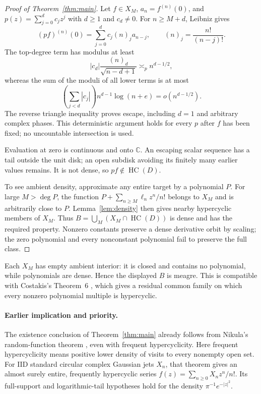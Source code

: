 \documentclass[11pt]{article}
\newcommand{\HC}{\operatorname{HC}}
\newcommand{\C}{\mathbb C}
\begin{document}
\begin{proof}[Proof of Theorem~\ref{thm:main}]
Let $f\in X_M$, $a_n=f^{(n)}(0)$, and
$p(z)=\sum_{j=0}^dc_jz^j$ with $d\ge1$ and $c_d\ne0$.
For $n\ge M+d$, Leibniz gives
\[
 (pf)^{(n)}(0)=\sum_{j=0}^dc_j(n)_j a_{n-j},
 \qquad (n)_j=\frac{n!}{(n-j)!}.
\]
The top-degree term has modulus at least
\[
               |c_d|\frac{(n)_d}{\sqrt{n-d+1}}
                    \asymp_p n^{d-1/2},
\]
whereas the sum of the moduli of all lower terms is at most
\[
             \left(\sum_{j<d}|c_j|\right)n^{d-1}\log(n+e)
                         =o(n^{d-1/2}).
\]
The reverse triangle inequality proves escape, including $d=1$ and arbitrary
complex phases. This deterministic argument holds for every $p$ after $f$
has been fixed; no uncountable intersection is used.

Evaluation at zero is continuous and onto $\C$. An escaping scalar sequence
has a tail outside the unit disk; an open subdisk avoiding its finitely many
earlier values remains. It is not dense, so $pf\notin\HC(D)$.

To see ambient density, approximate any entire target by a polynomial $P$.
For large $M>\deg P$, the function
$P+\sum_{n\ge M}\ell_nz^n/n!$ belongs to $X_M$ and is arbitrarily close to $P$.
Lemma~\ref{lem:density} then gives nearby hypercyclic members of $X_M$.
Thus $B=\bigcup_M(X_M\cap\HC(D))$ is dense and has the required property.
Nonzero constants preserve a dense derivative orbit by scaling; the zero
polynomial and every nonconstant polynomial fail to preserve the full class.
\end{proof}

Each $X_M$ has empty ambient interior: it is closed and contains no
polynomial, while polynomials are dense. Hence the displayed $B$ is meagre.
This is compatible with Costakis's Theorem~6 \cite[p.~330]{Costakis}, which
gives a residual common family on which every nonzero polynomial multiple
is hypercyclic.

\paragraph{Earlier implication and priority.}
The existence conclusion of Theorem~\ref{thm:main} already follows from
Nikula's random-function theorem \cite[arXiv v1, Thm.~1, pp.~2--3]{Nikula},
even with frequent hypercyclicity. Here frequent hypercyclicity means
positive lower density of visits to every nonempty open set.
For IID standard circular complex Gaussian jets $X_n$, that theorem gives
an almost surely entire, frequently hypercyclic series
$f(z)=\sum_{n\ge0}X_nz^n/n!$. Its full-support and logarithmic-tail
hypotheses hold for the density $\pi^{-1}e^{-|z|^2}$.
\end{document}
